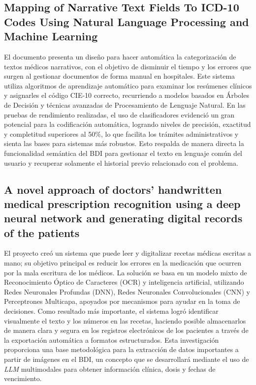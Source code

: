 \subsection[Mapping of Narrative Text Fields To ICD-10 Codes Using Natural Language Processing and Machine Learning]{Mapping of Narrative Text Fields To ICD-10 Codes Using Natural Language Processing and Machine Learning}
El documento \cite{nkolele} presenta un diseño para hacer automática la categorización de textos médicos narrativos, con el objetivo de disminuir el tiempo y los errores que surgen al gestionar documentos de forma manual en hospitales. Este sistema utiliza algoritmos de aprendizaje automático para examinar los resúmenes clínicos y asignarles el código CIE-10 correcto, recurriendo a modelos basados en Árboles de Decisión y técnicas avanzadas de Procesamiento de Lenguaje Natural. En las pruebas de rendimiento realizadas, el uso de clasificadores evidenció un gran potencial para la codificación automática, logrando niveles de precisión, exactitud y completitud superiores al 50\%, lo que facilita los trámites administrativos y sienta las bases para sistemas más robustos. Esto respalda de manera directa la funcionalidad semántica del BDI para gestionar el texto en lenguaje común del usuario y recuperar solamente el historial previo relacionado con el problema.

\subsection[A novel approach of doctors' handwritten medical prescription recognition using a deep neural network and generating digital records of the patients]{A novel approach of doctors' handwritten medical prescription recognition using a deep neural network and generating digital records of the patients}
El proyecto \cite{novel} creó un sistema que puede leer y digitalizar recetas médicas escritas a mano; su objetivo principal es reducir los errores en la medicación que ocurren por la mala escritura de los médicos. La solución se basa en un modelo mixto de Reconocimiento Óptico de Caracteres (OCR) y inteligencia artificial, utilizando Redes Neuronales Profundas (DNN), Redes Neuronales Convolucionales (CNN) y Perceptrones Multicapa, apoyados por mecanismos para ayudar en la toma de decisiones. Como resultado más importante, el sistema logró identificar visualmente el texto y los números en las recetas, haciendo posible almacenarlos de manera clara y segura en los registros electrónicos de los pacientes a través de la exportación automática a formatos estructurados. Esta investigación proporciona una base metodológica para la extracción de datos importantes a partir de imágenes en el BDI, un concepto que se desarrollará mediante el uso de \emph{LLM} multimodales para obtener información clínica, dosis y fechas de vencimiento.

